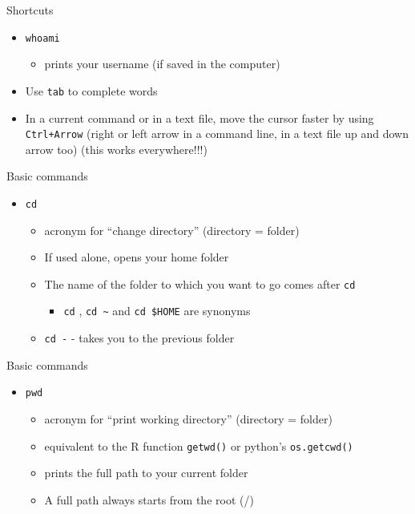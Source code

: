 \documentclass[
  ignorenonframetext,
]{beamer}
\providecommand{\tightlist}{%
  \setlength{\itemsep}{0pt}\setlength{\parskip}{0pt}}
\begin{document}
\begin{frame}[fragile]{Shortcuts}
\protect\hypertarget{slide4}{}
\begin{itemize}[<+->]
\tightlist
\item
  {\texttt{whoami}}

  \begin{itemize}[<+->]
  \tightlist
  \item
    prints your username (if saved in the computer)
  \end{itemize}
\item
  Use \texttt{tab} to complete words
\item
  In a current command or in a text file, move the cursor faster by
  using \texttt{Ctrl+Arrow} (right or left arrow in a command line, in a
  text file up and down arrow too) (this works everywhere!!!)
\end{itemize}
\end{frame}

\begin{frame}[fragile]{Basic commands}
\protect\hypertarget{slide5}{}
\begin{itemize}[<+->]
\tightlist
\item
  {\texttt{cd}}

  \begin{itemize}[<+->]
  \tightlist
  \item
    acronym for ``change directory'' (directory = folder)
  \item
    If used alone, opens your home folder
  \item
    The name of the folder to which you want to go comes after
    \texttt{cd}

    \begin{itemize}[<+->]
    \tightlist
    \item
      \texttt{cd} , \texttt{cd\ \textasciitilde{}} and
      \texttt{cd\ \$HOME} are synonyms
    \end{itemize}
  \item
    \texttt{cd\ -} - takes you to the previous folder
  \end{itemize}
\end{itemize}
\end{frame}

\begin{frame}[fragile]{Basic commands}
\protect\hypertarget{slide6}{}
\begin{itemize}[<+->]
\tightlist
\item
  {\texttt{pwd}}

  \begin{itemize}[<+->]
  \tightlist
  \item
    acronym for ``print working directory'' (directory = folder)
  \item
    equivalent to the R function \texttt{getwd()} or python's
    \texttt{os.getcwd()}
  \item
    prints the full path to your current folder
  \item
    A full path always starts from the root (/)
  \end{itemize}
\end{itemize}
\end{frame}
\end{document}
